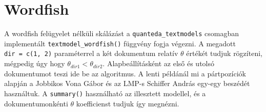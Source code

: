 \documentclass[
]{book}
\begin{document}
\hypertarget{wordfish}{%
\section{Wordfish}\label{wordfish}}

A wordfish felügyelet nélküli skálázást a \texttt{quanteda\_textmodels}
csomagban implementált \texttt{textmodel\_wordfish()} függvény fogja
végezni. A megadott \texttt{dir\ =\ c(1,\ 2)} paraméterrel a két
dokumentum relatív \(\theta\) értékét tudjuk rögzíteni, mégpedig úgy
hogy \(\theta_{dir1} < \theta_{dir2}\). Alapbeállításként az első és
utolsó dokumentumot teszi ide be az algoritmus. A lenti példánál mi a
pártpozíciók alapján a Jobbikos Vona Gábor és az LMP-s Schiffer András
egy-egy beszédét használtuk. A \texttt{summary()} használható az
illesztett modellel, és a dokumentumonkénti \(\theta\) koefficienst
tudjuk így megnézni.
\end{document}
